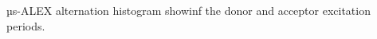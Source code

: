 \label{fig:altern_hist}
µs-ALEX alternation histogram showinf the donor and acceptor excitation periods.
